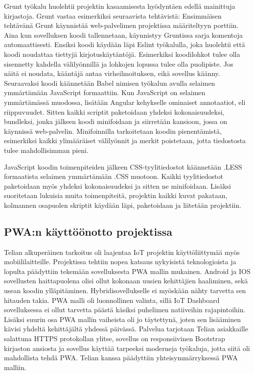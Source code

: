 \documentclass{tktltiki}
\begin{document}
Grunt työkalu huolehtii projektin kasaamisesta hyödyntäen edellä mainittuja kirjastoja. Grunt vastaa esimerkiksi seuraavista tehtävistä: Ensimmäisen tehtävänä Grunt käynnistää web-palvelimen projektissa määriteltyyn porttiin. Aina kun sovelluksen koodi tallennetaan, käynnistyy Gruntissa sarja komentoja automaattisesti. Ensiksi koodi käydään läpi Eslint työkalulla, joka huolehtii että koodi noudattaa tiettyjä kirjotuskäytäntöjä. Esimerkiksi koodilohkot tulee olla sisennetty kahdella välilyönnillä ja lohkojen lopussa tulee olla puolipiste. Jos näitä ei noudata, kääntäjä antaa virheilmoituksen, eikä sovellus käänny. Seuraavaksi koodi käännetään Babel nimisen työkalun avulla selaimen ymmärtämään JavaScript formaattiin. Kun JavaScript on selaimen ymmärtämässä muodossa, lisätään Angular kehykselle ominaiset annotaatiot, eli riippuvuudet. Sitten kaikki scriptit paketoidaan yhdeksi kokonaisuudeksi, bundleksi, jonka jälkeen koodi minifoidaan ja siirretään kansioon, jossa on käynnissä web-palvelin. Minifoinnilla tarkoitetaan koodin pienentämistä, esimerkiksi kaikki ylimääräiset välilyönnit ja merkit poistetaan, jotta tiedostosta tulee mahdollisimman pieni.

JavaScript koodin toimenpiteiden jälkeen CSS-tyylitiedostot käännetään .LESS formaatista selaimen ymmärtämään .CSS muotoon. Kaikki tyylitiedostot paketoidaan myös yhdeksi kokonaisuudeksi ja sitten ne minifoidaan. Lisäksi suoritetaan lukuisia muita toimenpiteitä, projektin kaikki kuvat pakataan, kolmannen osapuolen skriptit käydään läpi, paketoidaan ja liitetään projektiin.


\subsection{PWA:n käyttöönotto projektissa}

Telian alkuperäinen tarkoitus oli laajentaa IoT projektin käyttöliittymää myös mobiililaitteille. Projektissa tehtiin nopea katsaus nykyisistä teknologioista ja lopulta päädyttiin tekemään sovelluksesta PWA mallin mukainen. Android ja IOS sovellusten haittapuolena olisi ollut kokonaan uusien kehittäjien haaliminen, sekä usean koodin ylläpitäminen. Hybridisovellukselle ei myöskään nähty tarvetta sen hitauden takia. PWA malli oli luonnollinen valinta, sillä IoT Dashboard sovelluksessa ei ollut tarvetta päästä käsiksi puhelimen natiiveihin rajapintoihin. Lisäksi suurin osa PWA mallin vaiheista oli jo täytettynä, joten sen lisääminen kävisi yhdeltä kehittäjältä yhdessä päivässä. Palvelua tarjotaan Telian asiakkaille salattuna HTTPS protokollan ylitse, sovellus on responsiivinen Bootstrap kirjaston ansiosta ja sovellus käyttää tarpeeksi moderneja työkaluja, jotta siitä oli mahdollista tehdä PWA. Telian kanssa päädyttiin yhteisymmärryksessä PWA malliin. 
\end{document}
